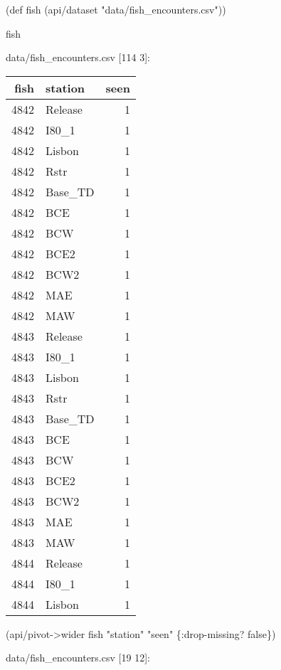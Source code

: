 \documentclass[]{article}
\newenvironment{Shaded}{\begin{snugshade}}{\end{snugshade}}
\newcommand{\StringTok}[1]{\textcolor[rgb]{0.31,0.60,0.02}{#1}}
\newcommand{\FunctionTok}[1]{\textcolor[rgb]{0.00,0.00,0.00}{#1}}
\newcommand{\VariableTok}[1]{\textcolor[rgb]{0.00,0.00,0.00}{#1}}
\newcommand{\BuiltInTok}[1]{#1}
\newcommand{\AttributeTok}[1]{\textcolor[rgb]{0.77,0.63,0.00}{#1}}
\newcommand{\NormalTok}[1]{#1}
\begin{document}
\begin{Shaded}
\begin{Highlighting}[]
\NormalTok{(}\BuiltInTok{def}\FunctionTok{ fish }\NormalTok{(api/dataset }\StringTok{"data/fish_encounters.csv"}\NormalTok{))}
\end{Highlighting}
\end{Shaded}

\begin{Shaded}
\begin{Highlighting}[]
\NormalTok{fish}
\end{Highlighting}
\end{Shaded}

data/fish\_encounters.csv {[}114 3{]}:

\begin{longtable}[]{@{}rlr@{}}
\toprule
fish & station & seen\tabularnewline
\midrule
\endhead
4842 & Release & 1\tabularnewline
4842 & I80\_1 & 1\tabularnewline
4842 & Lisbon & 1\tabularnewline
4842 & Rstr & 1\tabularnewline
4842 & Base\_TD & 1\tabularnewline
4842 & BCE & 1\tabularnewline
4842 & BCW & 1\tabularnewline
4842 & BCE2 & 1\tabularnewline
4842 & BCW2 & 1\tabularnewline
4842 & MAE & 1\tabularnewline
4842 & MAW & 1\tabularnewline
4843 & Release & 1\tabularnewline
4843 & I80\_1 & 1\tabularnewline
4843 & Lisbon & 1\tabularnewline
4843 & Rstr & 1\tabularnewline
4843 & Base\_TD & 1\tabularnewline
4843 & BCE & 1\tabularnewline
4843 & BCW & 1\tabularnewline
4843 & BCE2 & 1\tabularnewline
4843 & BCW2 & 1\tabularnewline
4843 & MAE & 1\tabularnewline
4843 & MAW & 1\tabularnewline
4844 & Release & 1\tabularnewline
4844 & I80\_1 & 1\tabularnewline
4844 & Lisbon & 1\tabularnewline
\bottomrule
\end{longtable}

\begin{Shaded}
\begin{Highlighting}[]
\NormalTok{(api/pivot->wider fish }\StringTok{"station"} \StringTok{"seen"}\NormalTok{ \{}\AttributeTok{:drop-missing}\NormalTok{? }\VariableTok{false}\NormalTok{\})}
\end{Highlighting}
\end{Shaded}

data/fish\_encounters.csv {[}19 12{]}:
\end{document}
